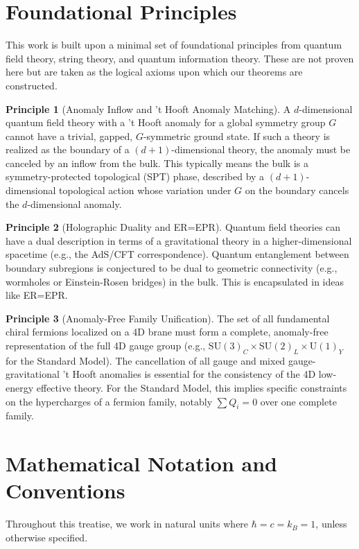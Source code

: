\documentclass[11pt, letterpaper]{report}
\theoremstyle{plain} %
\theoremstyle{definition} %
\newtheorem{principle}{Principle}[chapter]
\theoremstyle{remark} %
\newcommand{\U}[1]{\mathrm{U}(#1)}
\newcommand{\SU}[1]{\mathrm{SU}(#1)}
\begin{document}
\section{Foundational Principles}
\label{sec:principles}
This work is built upon a minimal set of foundational principles from quantum field theory, string theory, and quantum information theory. These are not proven here but are taken as the logical axioms upon which our theorems are constructed.

\begin{principle}[Anomaly Inflow and 't Hooft Anomaly Matching]
\label{principle:anomaly_inflow}
A $d$-dimensional quantum field theory with a 't Hooft anomaly for a global symmetry group $G$ cannot have a trivial, gapped, $G$-symmetric ground state. If such a theory is realized as the boundary of a $(d+1)$-dimensional theory, the anomaly must be canceled by an inflow from the bulk. This typically means the bulk is a symmetry-protected topological (SPT) phase, described by a $(d+1)$-dimensional topological action whose variation under $G$ on the boundary cancels the $d$-dimensional anomaly.
\end{principle}

\begin{principle}[Holographic Duality and ER=EPR]
\label{principle:holography}
Quantum field theories can have a dual description in terms of a gravitational theory in a higher-dimensional spacetime (e.g., the AdS/CFT correspondence). Quantum entanglement between boundary subregions is conjectured to be dual to geometric connectivity (e.g., wormholes or Einstein-Rosen bridges) in the bulk. This is encapsulated in ideas like ER=EPR.
\end{principle}

\begin{principle}[Anomaly-Free Family Unification]
\label{principle:family_unification}
The set of all fundamental chiral fermions localized on a 4D brane must form a complete, anomaly-free representation of the full 4D gauge group (e.g., $\SU{3}_C \times \SU{2}_L \times \U{1}_Y$ for the Standard Model). The cancellation of all gauge and mixed gauge-gravitational 't Hooft anomalies is essential for the consistency of the 4D low-energy effective theory. For the Standard Model, this implies specific constraints on the hypercharges of a fermion family, notably $\sum Q_i = 0$ over one complete family.
\end{principle}

\section{Mathematical Notation and Conventions}
\label{sec:notation}
Throughout this treatise, we work in natural units where $\hbar = c = k_B = 1$, unless otherwise specified.
\end{document}

